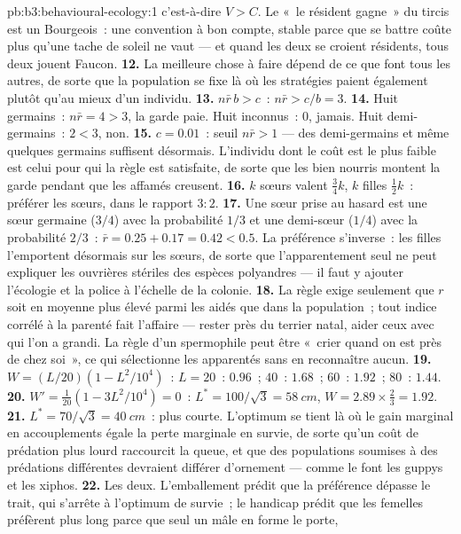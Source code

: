 \begin{solution}{pb:b3:behavioural-ecology:1}
c'est-à-dire $V > C$. Le «~le résident gagne~» du tircis est un
Bourgeois~: une convention à bon compte, stable parce que se battre coûte
plus qu'une tache de soleil ne vaut --- et quand les deux se croient
résidents, tous deux jouent Faucon.
\textbf{12.} La meilleure chose à faire dépend de ce que font tous les
autres, de sorte que la population se fixe là où les stratégies paient
également plutôt qu'au mieux d'un individu.
\textbf{13.} $n\bar r\,b > c$~: $n\bar r > c/b = 3$.
\textbf{14.} Huit germains~: $n\bar r = 4 > 3$, la garde paie. Huit
inconnus~: $0$, jamais. Huit demi-germains~: $2 < 3$, non.
\textbf{15.} $c = 0.01$~: seuil $n\bar r > 1$ --- des demi-germains et
même quelques germains suffisent désormais. L'individu dont le coût est
le plus faible est celui pour qui la règle est satisfaite, de sorte que
les bien nourris montent la garde pendant que les affamés creusent.
\textbf{16.} $k$ sœurs valent $\tfrac{3}{4}k$, $k$ filles
$\tfrac{1}{2}k$~: préférer les sœurs, dans le rapport $3{:}2$.
\textbf{17.} Une sœur prise au hasard est une sœur germaine ($3/4$) avec
la probabilité $1/3$ et une demi-sœur ($1/4$) avec la probabilité
$2/3$~: $\bar r = 0.25 +
0.17 = 0.42 < 0.5$. La préférence s'inverse~: les filles l'emportent
désormais sur les sœurs, de sorte que l'apparentement seul ne peut
expliquer les ouvrières stériles des espèces polyandres --- il faut y
ajouter l'écologie et la police à l'échelle de la colonie.
\textbf{18.} La règle exige seulement que $r$ soit en moyenne plus élevé
parmi les aidés que dans la population~; tout indice corrélé à la
parenté fait l'affaire --- rester près du terrier natal, aider ceux avec
qui l'on a grandi. La règle d'un spermophile peut être «~crier quand on
est près de chez soi~», ce qui sélectionne les apparentés sans en
reconnaître aucun.
\textbf{19.} $W = (L/20)(1 - L^{2}/10^{4})$~: $L = 20$~: $0.96$~; $40$~:
$1.68$~; $60$~: $1.92$~; $80$~: $1.44$.
\textbf{20.} $W' = \tfrac{1}{20}(1 - 3L^{2}/10^{4}) = 0$~: $L^{*} = 100/\sqrt{3}
= \qty{58}{cm}$, $W = 2.89\times\tfrac{2}{3} = 1.92$.
\textbf{21.} $L^{*} = 70/\sqrt{3} = \qty{40}{cm}$~: plus courte.
L'optimum se tient là où le gain marginal en accouplements égale la
perte marginale en survie, de sorte qu'un coût de prédation plus lourd
raccourcit la queue, et que des populations soumises à des prédations
différentes devraient différer d'ornement --- comme le font les guppys
et les xiphos.
\textbf{22.} Les deux. L'emballement prédit que la préférence dépasse le
trait, qui s'arrête à l'optimum de survie~; le handicap prédit que les
femelles préfèrent plus long parce que seul un mâle en forme le porte,

\end{solution}
